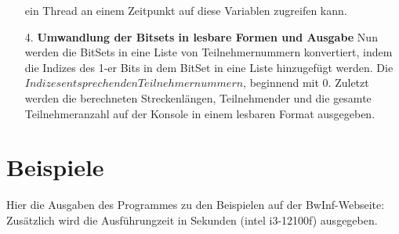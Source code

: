 \documentclass[a4paper,10pt,ngerman]{scrartcl}
\begin{document}
\begin{itemize}
  ein Thread an einem Zeitpunkt auf diese Variablen zugreifen kann.
  \item[4.] \textbf{Umwandlung der Bitsets in lesbare Formen und Ausgabe}
  \newline
  Nun werden die BitSets in eine Liste von Teilnehmernummern konvertiert, indem die Indizes des 1-er Bits in dem BitSet in eine Liste hinzugefügt werden. Die $Indizes entsprechen den Teilnehmernummern$, beginnend mit 0.
  Zuletzt werden die berechneten Streckenlängen, Teilnehmender und die gesamte Teilnehmeranzahl auf der Konsole in einem lesbaren Format ausgegeben.
\end{itemize}

\section{Beispiele}
Hier die Ausgaben des Programmes zu den Beispielen auf der BwInf-Webseite:
Zusätzlich wird die Ausführungzeit in Sekunden (intel i3-12100f) ausgegeben.
\end{document}
